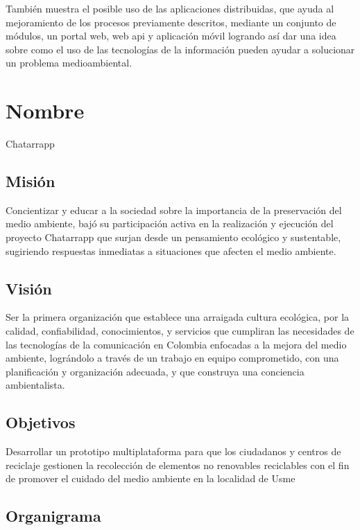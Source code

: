 También muestra el posible uso de las aplicaciones distribuidas, que ayuda al mejoramiento de los procesos previamente descritos, mediante un conjunto de módulos, un portal web, web api y aplicación móvil logrando así dar una idea sobre como el uso de las tecnologías de la información pueden ayudar a solucionar un problema medioambiental.


\section{Nombre}

Chatarrapp


\subsection{Misión}

Concientizar y educar a la sociedad sobre la importancia de la preservación del medio ambiente, bajó su participación activa en la realización y ejecución del proyecto Chatarrapp que surjan desde un pensamiento ecológico y sustentable, sugiriendo respuestas inmediatas a situaciones que afecten el medio ambiente.


\subsection{Visión}

Ser la primera organización que establece una arraigada cultura ecológica, por la calidad, confiabilidad, conocimientos, y servicios que cumpliran las necesidades de las tecnologías de la comunicación en Colombia enfocadas a la mejora del medio ambiente, lográndolo a través de un trabajo en equipo comprometido, con una planificación y organización adecuada, y que  construya una conciencia ambientalista.


\newpage

\subsection{Objetivos}

Desarrollar un prototipo multiplataforma para que los ciudadanos y centros de  reciclaje gestionen la recolección de elementos no renovables reciclables con el fin de promover el cuidado del medio ambiente en la localidad de Usme


\subsection{Organigrama}

